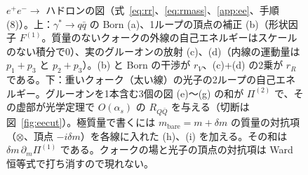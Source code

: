 \documentclass[a4paper,10pt]{ltjsarticle}
\begin{document}
\begin{figure}[tbp]
\caption{$e^+e^-\to$ ハドロンの図（式~\eqref{eq:rr}、\eqref{eq:rmass}、\ref{app:ee}、手順 (8)）。上：$\gamma^*\to q\bar q$ の Born (a)、1ループの頂点の補正 (b)（形状因子 $F^{(1)}$。質量のないクォークの外線の自己エネルギーはスケールのない積分で0）、実のグルーオンの放射 (c)、(d)（内線の運動量は $p_1+p_3$ と $p_2+p_3$）。(b) と Born の干渉が $r_V$、(c)+(d) の2乗が $r_R$ である。下：重いクォーク（太い線）の光子の2ループの自己エネルギー。グルーオンを1本含む3個の図 (e)〜(g) の和が $\Pi^{(2)}$ で、その虚部が光学定理で $O(\alpha_s)$ の $R_{Q\bar Q}$ を与える（切断は図~\ref{fig:eecut}）。極質量で書くには $m_{\mathrm{bare}}=m+\delta m$ の質量の対抗項（$\otimes$、頂点 $-i\delta m$）を各線に入れた (h)、(i) を加える。その和は $\delta m\,\partial_m\Pi^{(1)}$ である。クォークの場と光子の頂点の対抗項は Ward 恒等式で打ち消すので現れない。}
\label{fig:eediag}
\end{figure}
\end{document}

